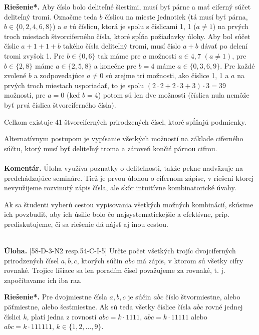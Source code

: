 \documentclass[11pt,a4paper,oneside,final]{book}
\newcommand{\kom}{\textbf{Komentár.} }
\newcommand{\ul}{\textbf{Úloha.} }
\newcommand{\rieh}{\textbf{Riešenie*.} }
\begin{document}
\rieh  Aby číslo bolo deliteľné šiestimi, musí byť párne a mať ciferný súčet deliteľný tromi. Označme teda $b$ číslicu na mieste jednotiek (tá musí byť párna, $b \in \{0, 2, 4, 6, 8\}$) a $a$ tú číslicu, ktorá je spolu s číslicami 1, 1 ($a \neq 1$) na prvých troch miestach štvorciferného čísla, ktoré spĺňa požiadavky úlohy. Aby bol súčet číslic $a + 1 + 1 + b$ takého čísla deliteľný tromi, musí číslo $a + b$ dávať po delení tromi zvyšok 1. Pre $b \in \{0, 6\}$ tak máme pre $a$ možnosti $a \in {4, 7}$ $(a \neq 1)$, pre $b \in \{2, 8\}$ máme $a \in \{2, 5, 8\}$ a konečne pre $b = 4$ máme $a \in \{0, 3, 6, 9\}$. Pre každé zvolené $b$ a zodpovedajúce $a \neq 0$ sú zrejme tri možnosti, ako číslice 1, 1 a $a$ na prvých troch miestach usporiadať, to je spolu $(2 \cdot 2 + 2 \cdot 3 + 3) \cdot 3 = 39$ možností, pre $a = 0$ (keď $b = 4$) potom sú len dve možnosti (číslica nula nemôže byť prvá číslica štvorciferného čísla).

Celkom existuje 41 štvorciferných prirodzených čísel, ktoré spĺňajú podmienky.

Alternatívnym postupom je vypísanie všetkých možností na základe ciferného súčtu, ktorý musí byť deliteľný troma a zároveň končiť párnou cifrou.\\
\\
\kom Úloha využíva poznatky o deliteľnosti, takže pekne nadväzuje na predchádzajúce semináre. Tiež je prvou úlohou o cifernom zápise, v riešení ktorej nevyužijeme rozvinutý zápis čísla, ale skôr intuitívne kombinatorické úvahy.

Ak sa študenti vyberú cestou vypisovania všetkých možných kombinácií, skúsime ich povzbudiť, aby ich úsilie bolo čo najsystematickejšie a efektívne, príp. prediskutujeme, či sa riešenie dá nájsť aj inou cestou. \\
\\
\begin{tcolorbox}[breakable,notitle,boxrule=0pt,colback=light-gray,colframe=light-gray]\ul [58-D-3-N2 resp.54-C-I-5]  Určte počet všetkých trojíc dvojciferných prirodzených čísel $a, b, c$, ktorých súčin $abc$ má zápis, v ktorom sú všetky cifry rovnaké. Trojice líšiace sa len poradím čísel považujeme za rovnaké, t. j. započítavame ich iba raz.

\end{tcolorbox}

\rieh Pre dvojmiestne čísla $a, b, c$ je súčin $abc$ číslo štvormiestne, alebo päťmiestne, alebo šesťmiestne. Ak sú teda všetky číslice čísla $abc$ rovné jednej číslici $k$, platí jedna z rovností $abc = k \cdot 1 111$, $abc = k \cdot 11 111$ alebo $abc = k \cdot 111 111$, $k \in \{1, 2, \ldots , 9\}$.
\end{document}
